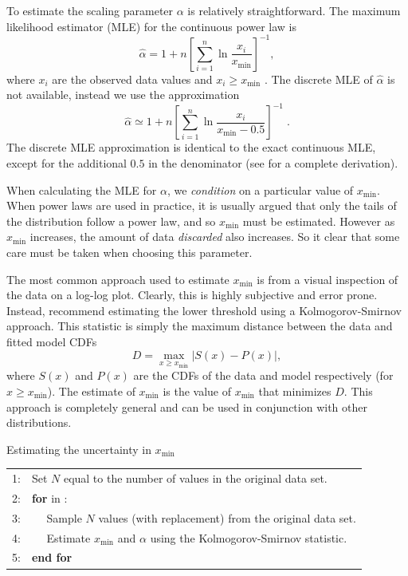 \documentclass[article]{jss}
\newcommand{\xmin}{x_{\min}}
\begin{document}
To estimate the scaling parameter $\alpha$ is relatively
straightforward.  The maximum likelihood estimator (MLE) for the
continuous power law is
\begin{equation}\label{6}
  \hat \alpha = 1 + n \left[\sum_{i=1}^n \ln \frac{x_i}{\xmin}\right]^{-1},
\end{equation}
where $x_i$ are the observed data values and $x_i \ge \xmin$
\citep{Muniruzzaman1957}. The discrete MLE of $\hat \alpha$ is not available,
instead we use the approximation
\begin{equation}\label{7}
\hat \alpha \simeq 1 + n \left[\sum_{i=1}^n \ln \frac{x_i}{\xmin - 0.5}\right]^{-1} \;.
\end{equation}
The discrete MLE approximation is
identical to the exact continuous MLE, except for the additional $0.5$ in the
denominator (see \cite{Clauset2009} for a complete derivation). 

When calculating the MLE for $\alpha$, we \textit{condition} on a particular
value of $\xmin$. When power laws are used in practice, it is usually argued
that only the tails of the distribution follow a power law, and so $\xmin$ must
be estimated. However as $\xmin$ increases, the amount of data \textit{discarded}
also increases. So it clear that some care must be taken when choosing this
parameter.

The most common approach used to estimate $\xmin$ is from a visual inspection of
the data on a log-log plot. Clearly, this is highly subjective and error prone.
Instead, \cite{Clauset2009} recommend estimating the lower threshold using a
Kolmogorov-Smirnov approach. This statistic is simply the maximum distance
between the data and fitted model CDFs
\begin{equation}\label{8}
  D = \max_{x \ge \xmin} \vert S(x) - P(x) \vert,
\end{equation}
where $S(x)$ and $P(x)$ are the CDFs of the data and model respectively (for $x
\ge \xmin$). The estimate of $\xmin$ is the value of $\xmin$ that minimizes $D$.
This approach is completely general and can be used in conjunction with other
distributions.

\begin{algorithm}[t]
  \caption{Estimating the uncertainty in $\xmin$ \citep{Clauset2007}}\label{A1}
 \begin{tabular}{@{}ll@{}}
   {\small 1:} & Set $N$ equal to the number of values in the original data set. \\
   {\small 2:} & \textbf{for} \code{i} in \code{1:B}:\\
   {\small 3:} & $\quad$ Sample $N$ values (with replacement) from the original data set. \\
   {\small 4:} & $\quad$ Estimate $\xmin$ and $\alpha$ using the Kolmogorov-Smirnov statistic.\\
   {\small 5:} & \textbf{end for} \\
  \end{tabular}
\end{algorithm}
\end{document}
